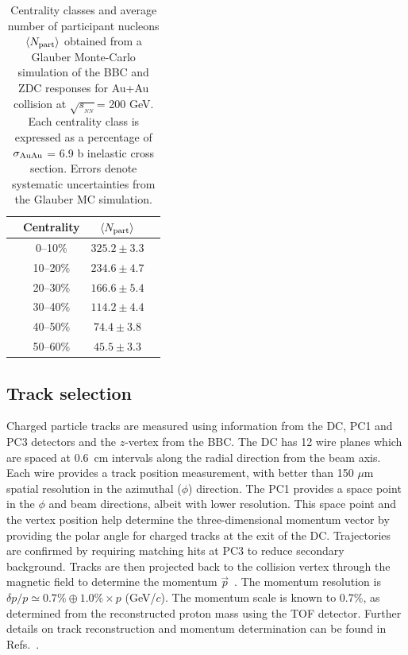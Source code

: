 \documentclass[aps,prc,superscriptaddress,showpacs,floatfix,twocolumn]{revtex4}
\newcommand \gevc{GeV/$c$\xspace}
\newcommand \Np{\mbox{$N_{\rm part}$}\xspace}
\newcommand \sqsn{\mbox{$\sqrt{s_{_{NN}}}$}\xspace}
\newcommand \anpart{\mbox{$\langle N_{\rm part} \rangle$}}
\newcommand \Au{{Au+Au}\xspace}
\begin{document}
\begin{table}[htbp]
\caption{\label{tab:sys0}
Centrality classes and average number of participant nucleons $\anpart$  obtained from a Glauber Monte-Carlo 
simulation of the BBC and ZDC responses for \Au collision at \sqsn = 200 GeV.  Each centrality class is expressed as 
a percentage of $\sigma_{\rm{AuAu}}$ = 6.9 b inelastic cross section. Errors denote systematic uncertainties from the 
Glauber MC simulation.
}
\begin{ruledtabular}\begin{tabular}{cccc}
&  Centrality     &       $\left<\Np\right>$ & \\ \hline
&   0--10\%        &       $325.2 \pm 3.3$    & \\  
&  10--20\%        &       $234.6 \pm 4.7$    & \\  
&  20--30\%        &       $166.6 \pm 5.4$    & \\ 
&  30--40\%        &       $114.2 \pm 4.4$    & \\  
&  40--50\%        &       $74.4  \pm 3.8$    & \\  
&  50--60\%        &       $45.5  \pm 3.3$    & \\  
\end{tabular}\end{ruledtabular}
\end{table}
\subsection{Track selection \label{subsec:track_selections}}

Charged particle tracks are measured using information from the 
DC, PC1 and PC3 detectors and the $z$-vertex from the BBC. The 
DC has 12 wire planes which are spaced at 0.6~cm intervals along 
the radial direction from the beam axis. Each wire provides a 
track position measurement, with better than 150 $\mu$m spatial 
resolution in the azimuthal ($\phi$) direction. The PC1 provides 
a space point in the $\phi$ and beam directions, albeit with 
lower resolution. This space point and the vertex position help 
determine the three-dimensional momentum vector by providing the 
polar angle for charged tracks at the exit of the DC. 
Trajectories are confirmed by requiring matching hits at PC3 to 
reduce secondary background. Tracks are then projected back to 
the collision vertex through the magnetic field to determine the 
momentum $\vec{p}$~\cite{Mitchell:2002wu}. The momentum 
resolution is $\delta p/p \simeq 0.7\% \oplus 1.0\%\times p$ 
(\gevc). The momentum scale is known to 0.7\%, as determined 
from the reconstructed proton mass using the TOF detector. 
Further details on track reconstruction and momentum 
determination can be found in 
Refs.~\cite{Mitchell:2002wu,Adler:2003au}.
\end{document}
